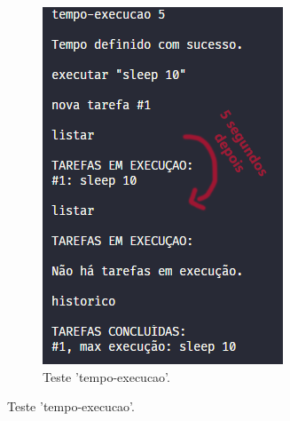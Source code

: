 \documentclass[a4paper]{report}
\begin{document}
\begin{figure}[H]
\begin{subfigure}{.3\textwidth}
			\includegraphics[width=.9\linewidth]{teste3.png}
			\caption{Teste 'tempo-execucao'.}
			\label{fig:test3}
		\end{subfigure}
	\end{figure}
		
\end{document}
